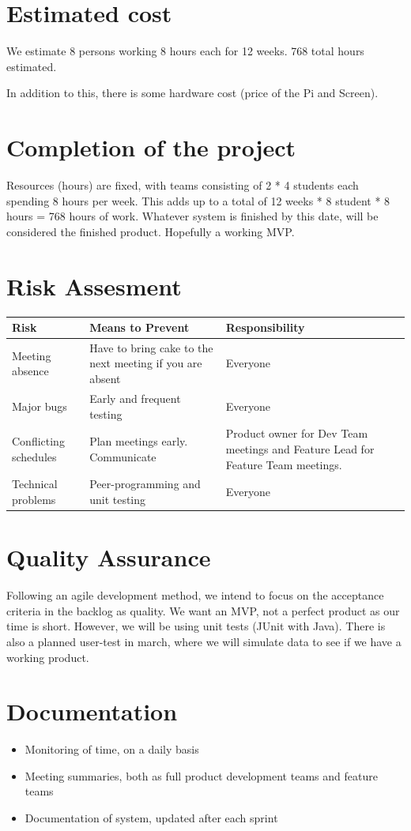 \documentclass[a4paper,12pt]{article}
\begin{document}
\section{Estimated cost}
We estimate 8 persons working 8 hours each for 12 weeks. 768 total hours estimated.

In addition to this, there is some hardware cost (price of the Pi and Screen).

\section{Completion of the project}
Resources (hours) are fixed, with teams consisting of 2 * 4 students each spending 8 hours per week. This adds up to a total of 12 weeks * 8 student * 8 hours = 768 hours of work. Whatever system is finished by this date, will be considered the finished product. Hopefully a working MVP.

\section{Risk Assesment}
\begin{tabularx}{\textwidth}{YYY}
	\hline
	Risk & Means to Prevent & Responsibility \\
	\hline
	Meeting absence & Have to bring cake to the next meeting if you are absent & Everyone\\
	Major bugs & Early and frequent testing & Everyone \\
	Conflicting schedules & Plan meetings early. Communicate & Product owner for Dev Team meetings and Feature Lead for Feature Team meetings. \\
	Technical problems & Peer-programming and unit testing & Everyone \\ \hline
\end{tabularx}

\section{Quality Assurance}
Following an agile development method, we intend to focus on the acceptance criteria in the backlog as quality. We want an MVP, not a perfect product as our time is short. However, we will be using unit tests (JUnit with Java). 
There is also a planned user-test in march, where we will simulate data to see if we have a working product.

\section{Documentation}
\begin{itemize}
	\item Monitoring of time, on a daily basis
	\item Meeting summaries, both as full product development teams and feature teams
	\item Documentation of system, updated after each sprint
\end{itemize}
\end{document}
